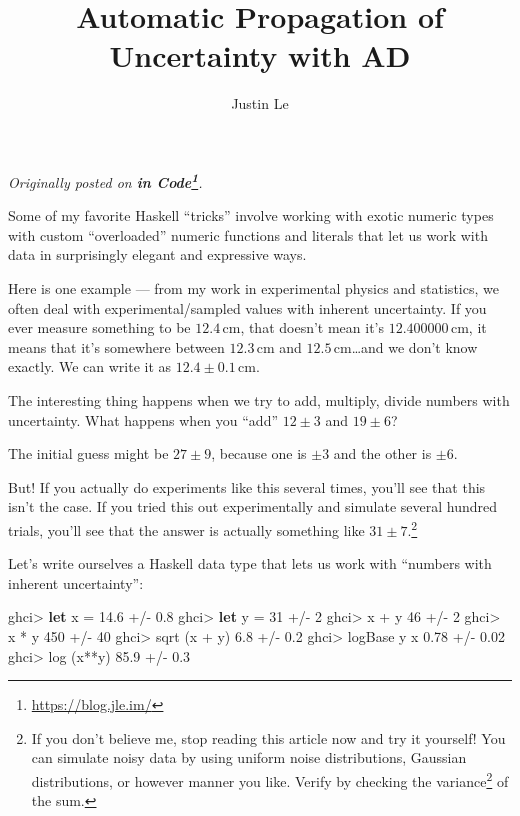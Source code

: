 \documentclass[]{article}
\title{Automatic Propagation of Uncertainty with AD}
\author{Justin Le}
\newenvironment{Shaded}{}{}
\newcommand{\KeywordTok}[1]{\textcolor[rgb]{0.00,0.44,0.13}{\textbf{{#1}}}}
\newcommand{\DecValTok}[1]{\textcolor[rgb]{0.25,0.63,0.44}{{#1}}}
\newcommand{\FloatTok}[1]{\textcolor[rgb]{0.25,0.63,0.44}{{#1}}}
\newcommand{\FunctionTok}[1]{\textcolor[rgb]{0.02,0.16,0.49}{{#1}}}
\newcommand{\NormalTok}[1]{{#1}}
\renewcommand{\href}[2]{#2\footnote{\url{#1}}}
\begin{document}
\maketitle

\emph{Originally posted on \textbf{\href{https://blog.jle.im/}{in
Code}}.}

Some of my favorite Haskell ``tricks'' involve working with exotic
numeric types with custom ``overloaded'' numeric functions and literals
that let us work with data in surprisingly elegant and expressive ways.

Here is one example --- from my work in experimental physics and
statistics, we often deal with experimental/sampled values with inherent
uncertainty. If you ever measure something to be \(12.4\,\mathrm{cm}\),
that doesn't mean it's \(12.400000\,\mathrm{cm}\), it means that it's
somewhere between \(12.3\,\mathrm{cm}\) and
\(12.5\,\mathrm{cm}\)\ldots{}and we don't know exactly. We can write it
as \(12.4 \pm 0.1\,\mathrm{cm}\).

The interesting thing happens when we try to add, multiply, divide
numbers with uncertainty. What happens when you ``add'' \(12 \pm 3\) and
\(19 \pm 6\)?

The initial guess might be \(27 \pm 9\), because one is \(\pm 3\) and
the other is \(\pm 6\).

But! If you actually do experiments like this several times, you'll see
that this isn't the case. If you tried this out experimentally and
simulate several hundred trials, you'll see that the answer is actually
something like \(31 \pm 7\).\footnote{If you don't believe me, stop
  reading this article now and try it yourself! You can simulate noisy
  data by using uniform noise distributions, Gaussian distributions, or
  however manner you like. Verify by checking the
  \href{https://en.wikipedia.org/wiki/Variance}{variance} of the sum.}

Let's write ourselves a Haskell data type that lets us work with
``numbers with inherent uncertainty'':

\begin{Shaded}
\begin{Highlighting}[]
\NormalTok{ghci}\FunctionTok{>} \KeywordTok{let} \NormalTok{x }\FunctionTok{=} \FloatTok{14.6} \FunctionTok{+/-} \FloatTok{0.8}
\NormalTok{ghci}\FunctionTok{>} \KeywordTok{let} \NormalTok{y }\FunctionTok{=} \DecValTok{31}   \FunctionTok{+/-} \DecValTok{2}
\NormalTok{ghci}\FunctionTok{>} \NormalTok{x }\FunctionTok{+} \NormalTok{y}
\DecValTok{46} \FunctionTok{+/-} \DecValTok{2}
\NormalTok{ghci}\FunctionTok{>} \NormalTok{x }\FunctionTok{*} \NormalTok{y}
\DecValTok{450} \FunctionTok{+/-} \DecValTok{40}
\NormalTok{ghci}\FunctionTok{>} \NormalTok{sqrt (x }\FunctionTok{+} \NormalTok{y)}
\FloatTok{6.8} \FunctionTok{+/-} \FloatTok{0.2}
\NormalTok{ghci}\FunctionTok{>} \NormalTok{logBase y x}
\FloatTok{0.78} \FunctionTok{+/-} \FloatTok{0.02}
\NormalTok{ghci}\FunctionTok{>} \NormalTok{log (x}\FunctionTok{**}\NormalTok{y)}
\FloatTok{85.9} \FunctionTok{+/-} \FloatTok{0.3}
\end{Highlighting}
\end{Shaded}
\end{document}

